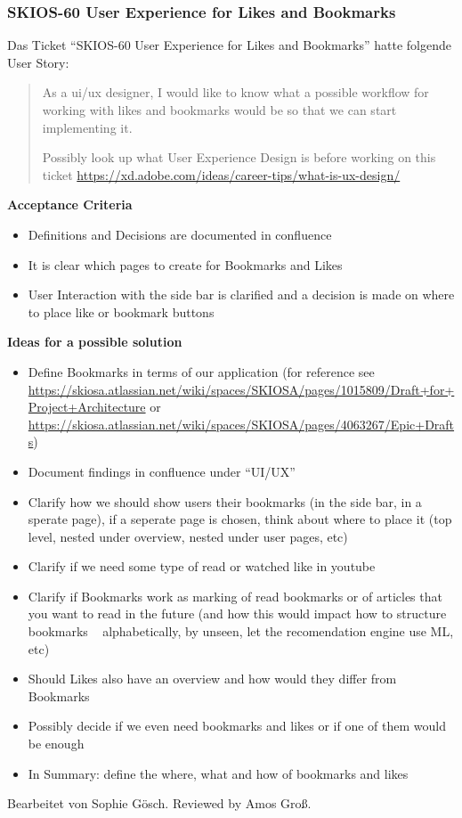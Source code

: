 \subsubsection{SKIOS-60 User Experience for Likes and Bookmarks}
Das Ticket \enquote{SKIOS-60 User Experience for Likes and Bookmarks} hatte folgende User Story:
\begin{quotation}
    As a ui/ux designer, I would like to know what a possible workflow for working with likes and bookmarks would be so that we can start implementing it.

    Possibly look up what User Experience Design is before working on this ticket \url{https://xd.adobe.com/ideas/career-tips/what-is-ux-design/}
\end{quotation}
\textbf{Acceptance Criteria}
    \begin{itemize}
        \item Definitions and Decisions are documented in confluence
        \item It is clear which pages to create for Bookmarks and Likes
        \item User Interaction with the side bar is clarified and a decision is made on where to place like or bookmark buttons
    \end{itemize}
\textbf{Ideas for a possible solution}
    \begin{itemize}
        \item Define Bookmarks in terms of our application (for reference see \url{https://skiosa.atlassian.net/wiki/spaces/SKIOSA/pages/1015809/Draft+for+Project+Architecture} or \url{https://skiosa.atlassian.net/wiki/spaces/SKIOSA/pages/4063267/Epic+Drafts})
        \item Document findings in confluence under “UI/UX”
        \item Clarify how we should show users their bookmarks (in the side bar, in a sperate page), if a seperate page is chosen, think about where to place it (top level, nested under overview, nested under user pages, etc)
        \item Clarify if we need some type of read or watched like in youtube
        \item Clarify if Bookmarks work as marking of read bookmarks or of articles that you want to read in the future (and how this would impact how to structure bookmarks  ~ alphabetically, by unseen, let the recomendation engine use ML, etc)
        \item Should Likes also have an overview and how would they differ from Bookmarks
        \item Possibly decide if we even need bookmarks and likes or if one of them would be enough
        \item In Summary: define the where, what and how of bookmarks and likes
    \end{itemize}
Bearbeitet von Sophie Gösch.
Reviewed by Amos Groß.

